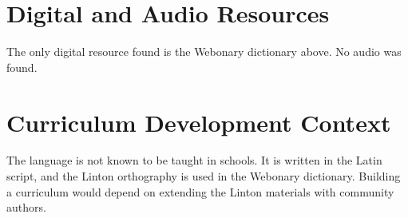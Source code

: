 \documentclass[12pt]{article}
\begin{document}
\section{Digital and Audio Resources}
The only digital resource found is the Webonary dictionary above. No audio was found.

\section{Curriculum Development Context}
The language is not known to be taught in schools. It is written in the Latin script, and the Linton orthography is used in the Webonary dictionary. Building a curriculum would depend on extending the Linton materials with community authors.
\end{document}
